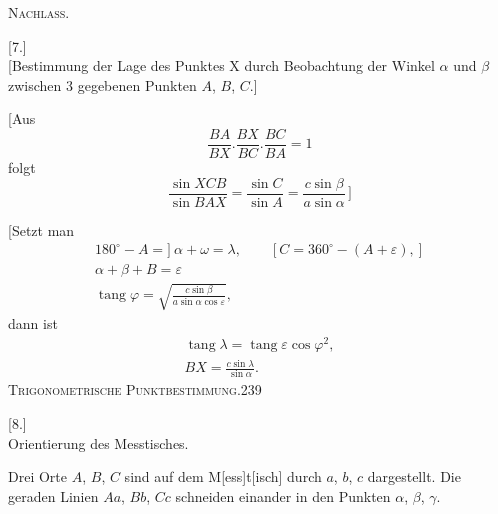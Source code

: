 \clearpage
{}\hfill\textsc{Nachlass.}\hfill\mbox{}\par
\vspace{1.5cm}
\begin{center}{\Large{}}\end{center}
\bigskip
\begin{center}[7.]\\[5pt]
[Bestimmung der Lage des Punktes X durch Beobachtung der Winkel $\alpha$ und $\beta$ zwischen 3 gegebenen Punkten $A$, $B$, $C$.]
\end{center}
[Aus
\[
\frac{BA}{BX}.\frac{BX}{BC}.\frac{BC}{BA}=1
\]
folgt
\[
\frac{\sin XCB}{\sin BAX}=\frac{\sin C}{\sin A}=\frac{c\sin\beta}{a\sin\alpha}\,\bigg]
\]
\begin{center}
\end{center}
[Setzt man
\[
\begin{gathered}
180^\circ-A=]\ \alpha+\omega=\lambda,\qquad [C=360^\circ-(A+\varepsilon),]\\
\alpha+\beta+B=\varepsilon\\[5pt]
\operatorname{tang}\varphi=\sqrt{\frac{c\sin\beta}{a\sin\alpha\cos\varepsilon}},
\end{gathered}
\]
dann ist
\[
\begin{gathered}
\operatorname{tang}\lambda=\operatorname{tang}\varepsilon\cos\varphi^2,\\
BX=\frac{c\sin\lambda}{\sin\alpha}.
\end{gathered}
\]
\clearpage
\noindent\mbox{}\hfill\textsc{Trigonometrische Punktbestimmung.}\hfill239\par\medskip
\begin{center}[8.]\\[5pt]Orientierung des Messtisches.\rlap{\hspace{.12em}\raisebox{1.15ex}{\scriptsize,}}\end{center}
Drei Orte $A$, $B$, $C$ sind auf dem M[ess]t[isch] durch $a$, $b$, $c$ dargestellt. Die geraden Linien $Aa$, $Bb$, $Cc$ schneiden einander in den Punkten $\alpha$, $\beta$, $\gamma$.


